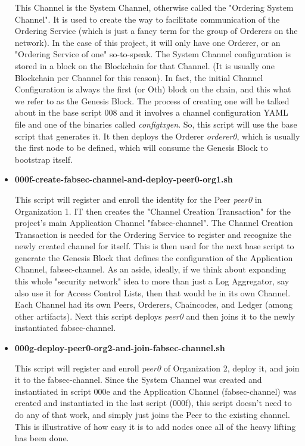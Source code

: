 \begin{itemize}
					\hspace{10mm}This Channel is the System Channel, otherwise called the "Ordering System Channel". It is used to create the way to facilitate communication of the Ordering Service (which is just a fancy term for the group of Orderers on the network). In the case of this project, it will only have one Orderer, or an "Ordering Service of one" so-to-speak. The System Channel configuration is stored in a block on the Blockchain for that Channel. (It is usually one Blockchain per Channel for this reason). In fact, the initial Channel Configuration is always the first (or Oth) block on the chain, and this what we refer to as the Genesis Block. The process of creating one will be talked about in the base script 008 and it involves a channel configuration YAML file and one of the binaries called \textit{configtxgen}. So, this script will use the base script that generates it. It then deploys the Orderer \textit{orderer0}, which is usually the first node to be defined, which will consume the Genesis Block to bootstrap itself.
					
				\item \textbf{000f-create-fabsec-channel-and-deploy-peer0-org1.sh}
				
					\hspace{10mm}This script will register and enroll the identity for the Peer \textit{peer0} in Organization 1. IT then creates the "Channel Creation Transaction" for the project's main Application Channel "fabsec-channel". The Channel Creation Transaction is needed for the Ordering Service to register and recognize the newly created channel for itself. This is then used for the next base script to generate the Genesis Block that defines the configuration of the Application Channel, fabsec-channel. As an aside, ideally, if we think about expanding this whole "security network" idea to more than just a Log Aggregator, say also use it for Access Control Lists, then that would be in its own Channel. Each Channel had its own Peers, Orderers, Chaincodes, and Ledger (among other artifacts). Next this script deploys \textit{peer0} and then joins it to the newly instantiated fabsec-channel.
					
				\item \textbf{000g-deploy-peer0-org2-and-join-fabsec-channel.sh}
				
					\hspace{10mm}This script will register and enroll \textit{peer0} of Organization 2, deploy it, and join it to the fabsec-channel. Since the System Channel was created and instantiated in script 000e and the Application Channel (fabsec-channel) was created and instantiated in the last script (000f), this script doesn't need to do any of that work, and simply just joins the Peer to the existing channel. This is illustrative of how easy it is to add nodes once all of the heavy lifting has been done.
					

\end{itemize}
